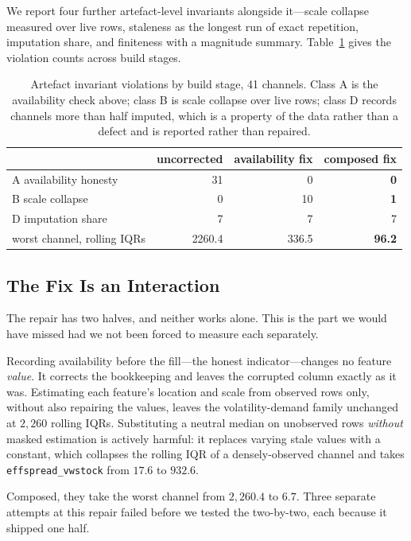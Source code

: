 We report four further artefact-level invariants alongside it---scale collapse
measured over live rows, staleness as the longest run of exact repetition,
imputation share, and finiteness with a magnitude summary. Table~\ref{tab:invariants}
gives the violation counts across build stages.

\begin{table}[t]
\centering
\caption{Artefact invariant violations by build stage, 41 channels. Class A is
the availability check above; class B is scale collapse over live rows; class D
records channels more than half imputed, which is a property of the data rather
than a defect and is reported rather than repaired.}
\label{tab:invariants}
\begin{tabular}{lrrr}
\toprule
& uncorrected & availability fix & \textbf{composed fix} \\
\midrule
A availability honesty & 31 & 0 & \textbf{0} \\
B scale collapse & 0 & 10 & \textbf{1} \\
D imputation share & 7 & 7 & 7 \\
\midrule
worst channel, rolling IQRs & 2260.4 & 336.5 & \textbf{96.2} \\
\bottomrule
\end{tabular}
\end{table}

\subsection{The Fix Is an Interaction}

The repair has two halves, and neither works alone. This is the part we would
have missed had we not been forced to measure each separately.

Recording availability before the fill---the honest indicator---changes no
feature \emph{value}. It corrects the bookkeeping and leaves the corrupted
column exactly as it was. Estimating each feature's location and scale from
observed rows only, without also repairing the values, leaves the
volatility-demand family unchanged at $2{,}260$ rolling IQRs. Substituting a
neutral median on unobserved rows \emph{without} masked estimation is actively
harmful: it replaces varying stale values with a constant, which collapses the
rolling IQR of a densely-observed channel and takes \texttt{effspread\_vwstock}
from $17.6$ to $932.6$.

Composed, they take the worst channel from $2{,}260.4$ to $6.7$. Three separate
attempts at this repair failed before we tested the two-by-two, each because it
shipped one half.

